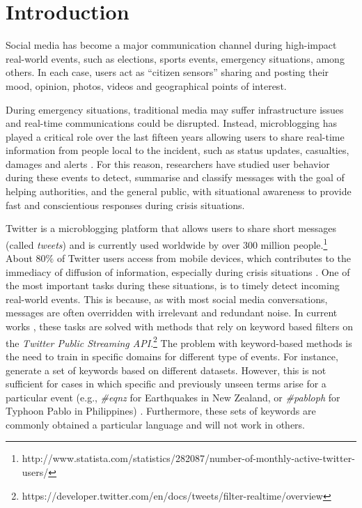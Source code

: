 \documentclass[sigconf]{acmart}
\begin{document}



\maketitle

\section{Introduction}
Social media has become a major communication channel during high-impact real-world events, such as elections, sports events, emergency situations, among others. In each case, users act as ``citizen sensors'' sharing and posting their mood, opinion, photos, videos and geographical points of interest.

During emergency situations, traditional media may suffer infrastructure issues and real-time communications could be disrupted. Instead, microblogging has played a critical role over the last fifteen years allowing users to share real-time information from people local to the incident, such as status updates, casualties, damages and alerts \cite{kumar2011tweettracker,imran2013extracting,stowe2016identifying,reuterfifteen}. For this reason, researchers have studied user behavior during these events to detect, summarise and classify messages with the goal of helping authorities, and the general public, with situational awareness to provide fast and conscientious responses during crisis situations.

Twitter is a microblogging platform that allows users to share short messages (called \textit{tweets}) and is currently used worldwide by over $300$ million people.\footnote{http://www.statista.com/statistics/282087/number-of-monthly-active-twitter-users/} About $80\%$ of Twitter users access from mobile devices, which contributes to the immediacy of diffusion of information, especially during crisis situations \cite{castillo2016big}. One of the most important tasks during these situations, is to timely detect incoming real-world events. This is because, as with most social media conversations, messages are often overridden with irrelevant and redundant noise. In current works \cite{kumar2011tweettracker,caragea2011classifying,imranaidr2014,maldonado2017}, these tasks are solved with methods that rely on keyword based filters on the \textit{Twitter Public Streaming API}.\footnote{https://developer.twitter.com/en/docs/tweets/filter-realtime/overview} The problem with keyword-based methods is the need to train in specific domains for different type of events. For instance, \citeauthor{olteanu2014} \cite{olteanu2014} generate a set of keywords based on different datasets. However, this is not sufficient for cases in which specific and previously unseen terms arise for a particular event (e.g., \textit{\#eqnz} for Earthquakes in New Zealand, or \textit{\#pabloph} for Typhoon Pablo in Philippines) \cite{potts2011tweeting,bruns2012local,karimi2013classifying}. Furthermore, these sets of keywords are commonly obtained a particular language and will not work in others.
\end{document}
